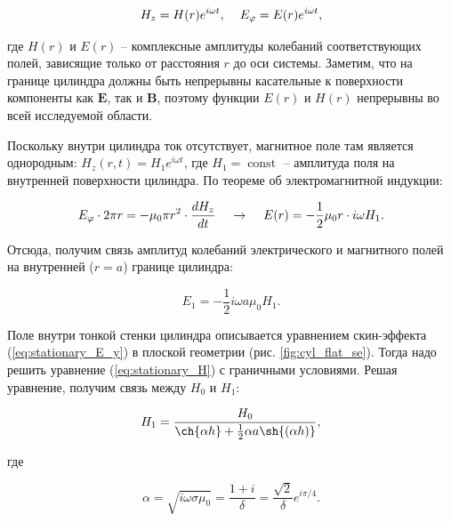 \documentclass[a4paper, 12pt]{article}
\begin{document}
    \begin{equation*}
        H_z = H(r) e^{i \omega t}, \hspace{4 mm} E_\varphi = E(r) e^{i \omega t},
    \end{equation*}

    где $H(r)$ и $E(r)$ -- комплексные амплитуды колебаний соответствующих полей, зависящие только от расстояния $r$ до оси системы. Заметим, что на границе цилиндра должны быть непрерывны касательные к поверхности компоненты как $\bm{E}$, так и $\bm{B}$, поэтому функции $E(r)$ и $H(r)$ непрерывны во всей исследуемой области.

    Поскольку внутри цилиндра ток отсутствует, магнитное поле там является однородным: $H_z(r,t) = H_1 e^{i \omega t}$, где $H_1 = \operatorname{const}$ -- амплитуда поля на внутренней поверхности цилиндра. По теореме об электромагнитной индукции:

    \begin{equation*}
        E_\varphi \cdot 2\pi r = -\mu_0 \pi r^2 \cdot \frac{d H_z}{dt} \hspace{4 mm} \rightarrow \hspace{4 mm} E(r) = -\frac{1}{2} \mu_0 r \cdot i \omega H_1. 
    \end{equation*}

    Отсюда, получим связь амплитуд колебаний электрического и магнитного полей на внутренней ($r = a$) границе цилиндра:

    \begin{equation}
        E_1 = -\frac{1}{2} i \omega a \mu_0 H_1.
    \end{equation}

    Поле внутри тонкой стенки цилиндра описывается уравнением скин-эффекта (\ref{eq:stationary_E_y}) в плоской геометрии (рис. \ref{fig:cyl_flat_se}). Тогда надо решить уравнение (\ref{eq:stationary_H}) с граничными условиями. Решая уравнение, получим связь между $H_0$ и $H_1$:

    \begin{equation}
        H_1 = \frac{H_0}{\ch{\alpha h} + \frac{1}{2} \alpha a \sh{(\alpha h)}},
        \label{eq:flat_cyl}
    \end{equation}

    где

    \begin{equation}
        \alpha = \sqrt{i \omega\sigma\mu_0} = \frac{1 + i}{\delta} = \frac{\sqrt{2}}{\delta} e^{i \pi/4}.
        \label{eq:alpha_flat_cyl}
    \end{equation}
\end{document}
